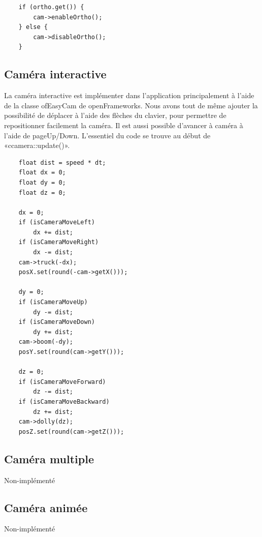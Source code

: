 \begin{lstlisting}
	if (ortho.get()) {
		cam->enableOrtho();
	} else {
		cam->disableOrtho();
	}
\end{lstlisting}

\subsection{Caméra interactive}
La caméra interactive est implémenter dans l'application principalement à l'aide de la classe ofEasyCam de openFrameworks. Nous avons tout de même ajouter la possibilité de déplacer à l'aide des flèches du clavier, pour permettre de repositionner facilement la caméra. Il est aussi possible d'avancer à caméra à l'aide de pageUp/Down. L'essentiel du code se trouve au début de «ccamera::update()».

\begin{lstlisting}
	float dist = speed * dt;
	float dx = 0;
	float dy = 0;
	float dz = 0;
	
	dx = 0;
	if (isCameraMoveLeft)
		dx += dist;
	if (isCameraMoveRight)
		dx -= dist;
	cam->truck(-dx);
	posX.set(round(-cam->getX()));
	
	dy = 0;
	if (isCameraMoveUp)
		dy -= dist;
	if (isCameraMoveDown)
		dy += dist;
	cam->boom(-dy);
	posY.set(round(cam->getY()));
	
	dz = 0;
	if (isCameraMoveForward)
		dz -= dist;
	if (isCameraMoveBackward)
		dz += dist;
	cam->dolly(dz);
	posZ.set(round(cam->getZ()));
\end{lstlisting}

\subsection{Caméra multiple}
Non-implémenté

\subsection{Caméra animée}
Non-implémenté
